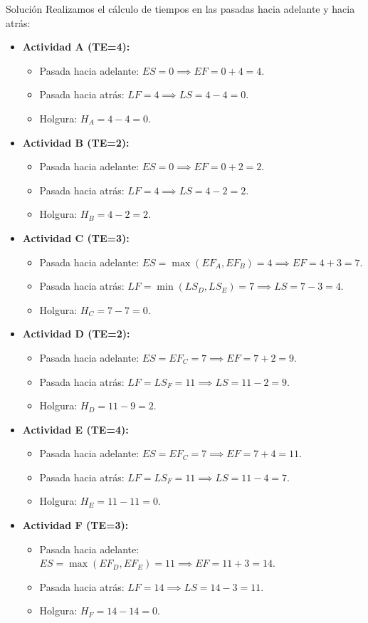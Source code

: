 \documentclass[11pt, a4paper]{article}
\begin{document}
\begin{ejercicio}{Solución}
  Realizamos el cálculo de tiempos en las pasadas hacia adelante y hacia atrás:
  \begin{itemize}
    \item \textbf{Actividad A (TE=4):}
      \begin{itemize}
        \item Pasada hacia adelante: $ES = 0 \implies EF = 0 + 4 = 4$.
        \item Pasada hacia atrás: $LF = 4 \implies LS = 4 - 4 = 0$.
        \item Holgura: $H_A = 4 - 4 = 0$.
      \end{itemize}
    \item \textbf{Actividad B (TE=2):}
      \begin{itemize}
        \item Pasada hacia adelante: $ES = 0 \implies EF = 0 + 2 = 2$.
        \item Pasada hacia atrás: $LF = 4 \implies LS = 4 - 2 = 2$.
        \item Holgura: $H_B = 4 - 2 = 2$.
      \end{itemize}
    \item \textbf{Actividad C (TE=3):}
      \begin{itemize}
        \item Pasada hacia adelante: $ES = \max(EF_A, EF_B) = 4 \implies EF = 4 + 3 = 7$.
        \item Pasada hacia atrás: $LF = \min(LS_D, LS_E) = 7 \implies LS = 7 - 3 = 4$.
        \item Holgura: $H_C = 7 - 7 = 0$.
      \end{itemize}
    \item \textbf{Actividad D (TE=2):}
      \begin{itemize}
        \item Pasada hacia adelante: $ES = EF_C = 7 \implies EF = 7 + 2 = 9$.
        \item Pasada hacia atrás: $LF = LS_F = 11 \implies LS = 11 - 2 = 9$.
        \item Holgura: $H_D = 11 - 9 = 2$.
      \end{itemize}
    \item \textbf{Actividad E (TE=4):}
      \begin{itemize}
        \item Pasada hacia adelante: $ES = EF_C = 7 \implies EF = 7 + 4 = 11$.
        \item Pasada hacia atrás: $LF = LS_F = 11 \implies LS = 11 - 4 = 7$.
        \item Holgura: $H_E = 11 - 11 = 0$.
      \end{itemize}
    \item \textbf{Actividad F (TE=3):}
      \begin{itemize}
        \item Pasada hacia adelante: $ES = \max(EF_D, EF_E) = 11 \implies EF = 11 + 3 = 14$.
        \item Pasada hacia atrás: $LF = 14 \implies LS = 14 - 3 = 11$.
        \item Holgura: $H_F = 14 - 14 = 0$.
      \end{itemize}
  \end{itemize}


\end{ejercicio}
\end{document}
